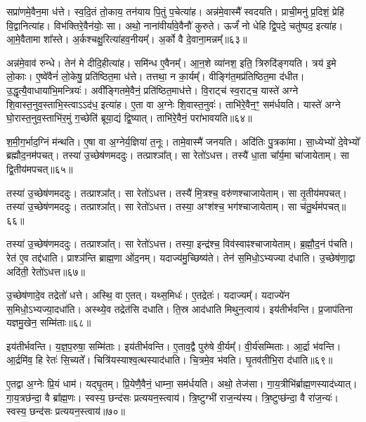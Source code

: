 सप्रा॑णमे॒वैन॒मा ध॑त्ते।
स्व॒दि॒तं तो॒काय॒ तन॑याय पि॒तुं प॒चेत्या॑ह।
अन्न॑मे॒वास्मै᳚ स्वदयति।
प्राची॒मनु॑ प्र॒दिशं॒ प्रेहि॑ वि॒द्वानित्या॑ह।
विभ॑क्तिरे॒वैन॑योः॒ सा।
अथो॒ नाना॑वीर्यावे॒वैनौ॑ कुरुते।
ऊर्जं॑ नो धेहि द्वि॒पदे॒ चतु॑ष्पद॒ इत्या॑ह।
आ॒\-मे॒वैतामा शा᳚स्ते।
अ॒र्कश्चक्षु॒रित्या॑हव॒नीयम्᳚।
अ॒र्को वै दे॒वाना॒मन्नम्᳚॥६३॥

अन्न॑मे॒वाव॑ रुन्धे।
तेन॑ मे दीदि॒हीत्या॑ह।
समि॑न्ध ए॒वैनम्᳚।
आ॒न॒शे व्या॑नश॒ इति॒ त्रिरुदि॑ङ्गयति।
त्रय॑ इ॒मे लो॒काः।
ए॒ष्वे॑वैनं॑ लो॒केषु॒ प्रति॑\-ष्ठित॒मा ध॑त्ते।
तत्तथा॒ न का॒र्यम्᳚।
वीङ्गि॑त॒मप्र॑तिष्ठित॒मा द॑धीत।
उ॒द्धृत्यै॒वाधाया॑भि॒मन्त्रियः॑।
अवी᳚ङ्गितमे॒वैनं॒ प्रति॑\-ष्ठित॒माध॑त्ते।
वि॒राट्च॑ स्व॒राट्च॒ यास्ते॑ अग्ने शि॒वास्त॒नुव॒स्ताभि॒स्त्वा\-ऽऽद॑ध॒ इत्या॑ह।
ए॒ता वा अ॒ग्नेः शि॒वास्त॒नुवः॑।
ताभि॑रे॒वैन॒ꣳ॒ सम॑र्धयति।
यास्ते॑ अग्ने घो॒रास्त॒नुव॒स्ताभि॑र॒मुं ग॒च्छेति॑ ब्रूया॒द्यं द्वि॒ष्यात्।
ताभि॑रे॒वैनं॒ परा॑भावयति॥६४॥\anuvakamend[लो॒को॑\-ऽ\-सृजतैन॒माध॑त्ते\-ऽन्वाहार्य॒पच॑नं दे॒वाना॒मन्न॑मेनं॒ प्रति॑\-ष्ठित॒माध॑त्ते॒ पञ्च॑ च]

श॒मी॒ग॒र्भाद॒ग्निं म॑न्थति।
ए॒षा वा अ॒ग्नेर्य॒ज्ञिया॑ त॒नूः।
तामे॒वास्मै॑ जनयति।
अदि॑तिः पु॒त्रका॑मा।
सा॒ध्येभ्यो॑ दे॒वेभ्यो᳚ ब्रह्मौद॒नम॑पचत्।
तस्या॑ उ॒च्छेष॑णमददुः।
तत्प्राश्ञा᳚त्।
सा रेतो॑\-ऽधत्त।
तस्यै॑ धा॒ता चा᳚र्य॒मा चा॑जायेताम्।
सा द्वि॒तीय॑मपचत्॥६५॥

तस्या॑ उ॒च्छेष॑णमददुः।
तत्प्राश्ञा᳚त्।
सा रेतो॑\-ऽधत्त।
तस्यै॑ मि॒त्रश्च॒ वरु॑णश्चाजायेताम्।
सा तृ॒तीय॑मपचत्।
तस्या॑ उ॒च्छेष॑णमददुः।
तत्प्राश्ञा᳚त्।
सा रेतो॑\-ऽधत्त।
तस्या॒ अꣳश॑श्च॒ भग॑श्चाजायेताम्।
सा च॑तु॒र्थम॑पचत्॥६६॥

तस्या॑ उ॒च्छेष॑णमददुः।
तत्प्राश्ञा᳚त्।
सा रेतो॑\-ऽधत्त।
तस्या॒ इन्द्र॑श्च॒ विव॑स्वाꣴश्चाजायेताम्।
ब्र॒ह्मौ॒द॒नं प॑चति।
रेत॑ ए॒व तद्द॑धाति।
प्राश्ञ॑न्ति ब्राह्म॒णा ओ॑द॒नम्।
यदाज्य॑मु॒च्छिष्य॑ते।
तेन॑ स॒मिधो॒\-ऽभ्यज्या द॑धाति।
उ॒च्छेष॑णा॒द्वा अदि॑ती॒ रेतो॑\-ऽधत्त॥६७॥

उ॒च्छेष॑णादे॒व तद्रेतो॑ धत्ते।
अस्थि॒ वा ए॒तत्।
यथ्स॒मिधः॑।
ए॒तद्रेतः॑।
यदाज्यम्᳚।
यदाज्ये॑न स॒मिधो॒\-ऽभ्यज्या॒दधा॑ति।
अस्थ्ये॒व तद्रेत॑सि दधाति।
ति॒स्र आद॑धाति मिथुन॒त्वाय॑।
इय॑तीर्भवन्ति।
प्र॒जा\-प॑तिना यज्ञमु॒खेन॒ सम्मि॑ताः॥६८॥

इय॑तीर्भवन्ति।
य॒ज्ञ॒प॒रुषा॒ सम्मि॑ताः।
इय॑तीर्भवन्ति।
ए॒ताव॒द्वै पुरु॑षे वी॒र्यम्᳚।
वी॒र्य॑सम्मिताः।
आ॒र्द्रा भ॑वन्ति।
आ॒र्द्रमि॑व॒ हि रेतः॑ सि॒च्यते᳚।
चित्रि॑यस्याश्व॒त्थस्याद॑धाति।
चि॒त्रमे॒व भ॑वति।
घृ॒तव॑तीभि॒रा द॑धाति॥६९॥

ए॒तद्वा अ॒ग्नेः प्रि॒यं धाम॑।
यद्\mbox{}घृ॒तम्।
प्रि॒येणै॒वैनं॒ धाम्ना॒ सम॑र्ध\-यति।
अथो॒ तेज॑सा।
गा॒य॒त्रीभि॑र्ब्राह्म॒णस्याद॑ध्यात्।
गा॒य॒त्र\-छ॑न्दा॒ वै ब्रा᳚ह्म॒णः।
स्वस्य॒ छन्द॑सः प्रत्ययन॒स्त्वाय॑।
त्रि॒ष्टुग्भी॑ राज॒न्य॑स्य।
त्रि॒ष्टुप्छ॑न्दा॒ वै रा॑ज॒न्यः॑।
स्वस्य॒ छन्द॑सः प्रत्ययन॒स्त्वाय॑॥७०॥

